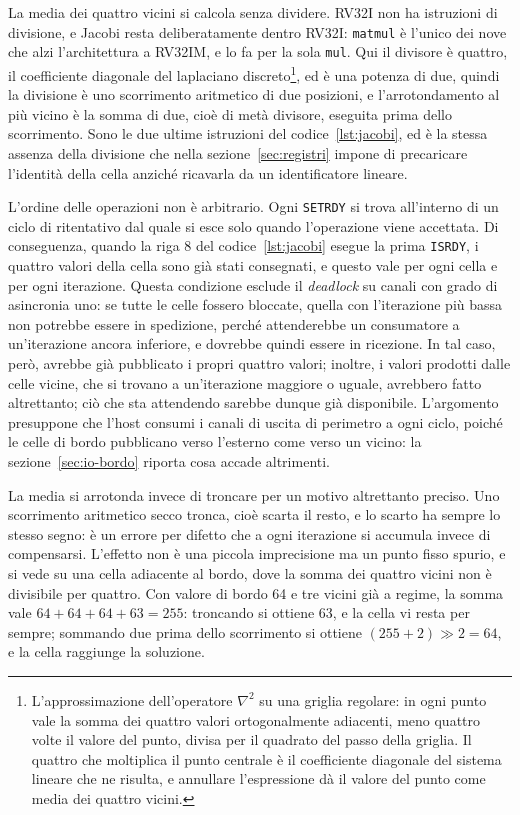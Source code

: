 La media dei quattro vicini si calcola senza dividere. RV32I non ha istruzioni
di divisione, e Jacobi resta deliberatamente dentro RV32I: \texttt{matmul} è
l'unico dei nove che alzi l'architettura a RV32IM, e lo fa per la sola
\texttt{mul}. Qui il divisore è quattro, il coefficiente diagonale del
laplaciano discreto\footnote{L'approssimazione dell'operatore $\nabla^2$ su una
griglia regolare: in ogni punto vale la somma dei quattro valori ortogonalmente
adiacenti, meno quattro volte il valore del punto, divisa per il quadrato del
passo della griglia. Il quattro che moltiplica il punto centrale è il
coefficiente diagonale del sistema lineare che ne risulta, e annullare
l'espressione dà il valore del punto come media dei quattro vicini.}, ed è una
potenza di due, quindi la divisione
è uno scorrimento aritmetico di due posizioni, e l'arrotondamento al più vicino
è la somma di due, cioè di metà divisore, eseguita prima dello scorrimento.
Sono le due ultime istruzioni del codice~\ref{lst:jacobi}, ed è la stessa
assenza della divisione che nella sezione~\ref{sec:registri} impone di
precaricare l'identità della cella anziché ricavarla da un identificatore
lineare.

L’ordine delle operazioni non è arbitrario. Ogni \texttt{SETRDY} si trova all’interno di
un ciclo di ritentativo dal quale si esce solo quando l’operazione viene accettata.
Di conseguenza, quando la riga 8 del codice~\ref{lst:jacobi} esegue la prima \texttt{ISRDY}, i quattro
valori della cella sono già stati consegnati, e questo vale per ogni cella e per
ogni iterazione. Questa condizione esclude il \emph{deadlock} su canali con grado di asincronia uno:
se tutte le celle fossero bloccate, quella con l’iterazione più bassa non potrebbe
essere in spedizione, perché attenderebbe un consumatore a un’iterazione ancora inferiore,
e dovrebbe quindi essere in ricezione. In tal caso, però, avrebbe già pubblicato i propri
quattro valori; inoltre, i valori prodotti dalle celle vicine, che si trovano a un’iterazione
maggiore o uguale, avrebbero fatto altrettanto; ciò che sta attendendo sarebbe dunque già disponibile.
L'argomento presuppone che l'host consumi i canali di uscita
di perimetro a ogni ciclo, poiché le celle di bordo pubblicano verso l'esterno
come verso un vicino: la sezione~\ref{sec:io-bordo} riporta cosa accade
altrimenti.

La media si arrotonda invece di troncare per un motivo altrettanto preciso. Uno
scorrimento aritmetico secco tronca, cioè scarta il resto, e lo scarto ha
sempre lo stesso segno: è un errore per difetto che a ogni iterazione si
accumula invece di compensarsi. L'effetto non è una piccola imprecisione ma un
punto fisso spurio, e si vede su una cella adiacente al bordo, dove la somma
dei quattro vicini non è divisibile per quattro. Con valore di bordo 64 e tre vicini
già a regime, la somma vale $64 + 64 + 64 + 63 = 255$: troncando si ottiene 63,
e la cella vi resta per sempre; sommando due prima dello scorrimento si ottiene
$(255+2) \gg 2 = 64$, e la cella raggiunge la soluzione.

